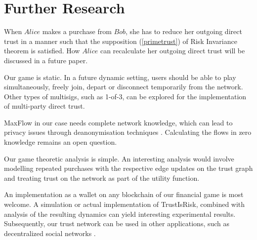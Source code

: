 \section{Further Research}

    When $Alice$ makes a purchase from $Bob$, she has to reduce her outgoing direct trust in a manner such that the
    supposition (\ref{primetrust}) of Risk Invariance theorem is satisfied. How $Alice$ can recalculate her outgoing
    direct trust will be discussed in a future paper.

    Our game is static. In a future dynamic setting, users should be able to play simultaneously, freely join, depart or
    disconnect temporarily from the network. Other types of multisigs, such as 1-of-3, can be explored for the
    implementation of multi-party direct trust.

    MaxFlow in our case needs complete network knowledge, which can lead to privacy issues through deanonymisation
    techniques \cite{deanonymisation}. Calculating the flows in zero knowledge remains an open question.

    Our game theoretic analysis is simple. An interesting analysis would involve modelling repeated purchases with the
    respective edge updates on the trust graph and treating trust on the network as part of the utility function.

    An implementation as a wallet on any blockchain of our financial game is most welcome. A simulation or actual
    implementation of TrustIsRisk, combined with analysis of the resulting dynamics can yield interesting experimental
    results. Subsequently, our trust network can be used in other applications, such as decentralized social networks
    \cite{synereo}.

